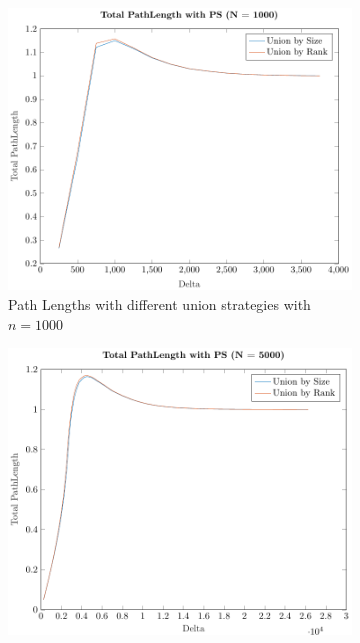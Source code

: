 \begin{figure}[ht]
    \centering
    \begin{subfigure}{0.32\textwidth}
        \centering
        \includegraphics[width=\textwidth]{../images/plotPSNonFull1000_PathLength.pdf}
        \caption{Path Lengths with different union strategies with $n = 1000$}
    \end{subfigure}%
    \hfill
    \begin{subfigure}{0.32\textwidth}
        \centering
        \includegraphics[width=\textwidth]{../images/plotPSNonFull5000_PathLength.pdf}

\end{subfigure}
\end{figure}
